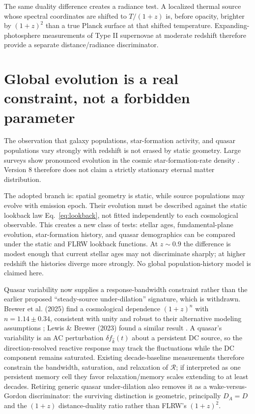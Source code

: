 \documentclass[11pt]{article}
\begin{document}
The same duality difference creates a radiance test. A localized thermal source whose spectral coordinates are shifted to $T/(1+z)$ is, before opacity, brighter by $(1+z)^2$ than a true Planck surface at that shifted temperature. Expanding-photosphere measurements of Type II supernovae at moderate redshift therefore provide a separate distance/radiance discriminator.

\section{Global evolution is a real constraint, not a forbidden parameter}
The observation that galaxy populations, star-formation activity, and quasar populations vary strongly with redshift is not erased by static geometry. Large surveys show pronounced evolution in the cosmic star-formation-rate density \citep{MadauDickinson2014}. Version 8 therefore does not claim a strictly stationary eternal matter distribution.

The adopted branch is: spatial geometry is static, while source populations may evolve with emission epoch. Their evolution must be described against the static lookback law Eq.~\eqref{eq:lookback}, not fitted independently to each cosmological observable. This creates a new class of tests: stellar ages, fundamental-plane evolution, star-formation history, and quasar demographics can be compared under the static and FLRW lookback functions. At $z\sim0.9$ the difference is modest enough that current stellar ages may not discriminate sharply; at higher redshift the histories diverge more strongly. No global population-history model is claimed here.

Quasar variability now supplies a response-bandwidth constraint rather than the earlier proposed ``steady-source under-dilation'' signature, which is withdrawn. Brewer et al. (2025) find a cosmological dependence $(1+z)^n$ with $n=1.14\pm0.34$, consistent with unity and robust to their alternative modeling assumptions \citep{BrewerLewisLi2025}; Lewis \& Brewer (2023) found a similar result \citep{LewisBrewer2023}. A quasar's variability is an AC perturbation $\delta f_{\hat{k}}(t)$ about a persistent DC source, so the direction-resolved reactive response may track the fluctuations while the DC component remains saturated. Existing decade-baseline measurements therefore constrain the bandwidth, saturation, and relaxation of $\mathcal{R}$; if interpreted as one persistent memory cell they favor relaxation/memory scales extending to at least decades. Retiring generic quasar under-dilation also removes it as a wake-versus-Gordon discriminator: the surviving distinction is geometric, principally $D_A=D$ and the $(1+z)$ distance-duality ratio rather than FLRW's $(1+z)^2$.
\end{document}
